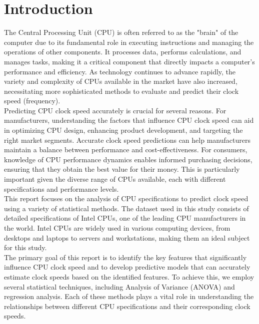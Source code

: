 \section{Introduction}

The Central Processing Unit (CPU) is often referred to as the "brain" of the computer due to its fundamental role in executing instructions and managing the operations of other components. It processes data, performs calculations, and manages tasks, making it a critical component that directly impacts a computer's performance and efficiency. As technology continues to advance rapidly, the variety and complexity of CPUs available in the market have also increased, necessitating more sophisticated methods to evaluate and predict their clock speed (frequency).\\

Predicting CPU clock speed accurately is crucial for several reasons. For manufacturers, understanding the factors that influence CPU clock speed can aid in optimizing CPU design, enhancing product development, and targeting the right market segments. Accurate clock speed predictions can help manufacturers maintain a balance between performance and cost-effectiveness. For consumers, knowledge of CPU performance dynamics enables informed purchasing decisions, ensuring that they obtain the best value for their money. This is particularly important given the diverse range of CPUs available, each with different specifications and performance levels.\\

This report focuses on the analysis of CPU specifications to predict clock speed using a variety of statistical methods. The dataset used in this study consists of detailed specifications of Intel CPUs, one of the leading CPU manufacturers in the world. Intel CPUs are widely used in various computing devices, from desktops and laptops to servers and workstations, making them an ideal subject for this study.\\

The primary goal of this report is to identify the key features that significantly influence CPU clock speed and to develop predictive models that can accurately estimate clock speeds based on the identified features. To achieve this, we employ several statistical techniques, including Analysis of Variance (ANOVA) and regression analysis. Each of these methods plays a vital role in understanding the relationships between different CPU specifications and their corresponding clock speeds.\\

